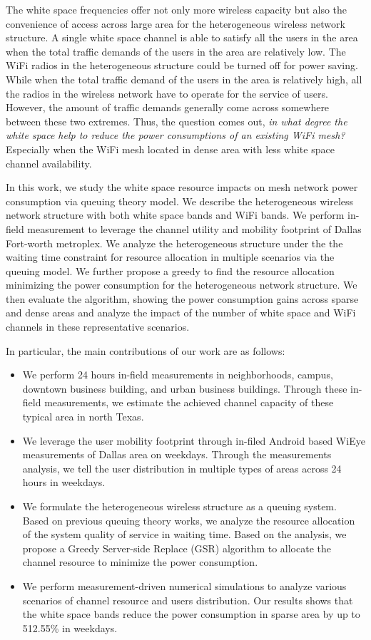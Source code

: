 The white space frequencies offer not only more wireless capacity but also the convenience of access 
across large area for the heterogeneous wireless network structure. 
A single white space channel is able to satisfy all the users in the area when the total traffic demands of 
the users in the area are relatively low. The WiFi radios in the heterogeneous structure could be turned off 
for power saving. 
While when the total traffic demand of the users in the area is relatively high, all the radios in the wireless network 
have to operate for the service of users.
However, the amount of traffic demands generally come across somewhere between these two extremes. Thus, the 
question comes out, {\it in what degree the white space help to reduce the power consumptions of an existing 
WiFi mesh?} Especially when the WiFi mesh located in dense area with less white space channel availability.

In this work, we study the white space resource impacts on mesh network power consumption via queuing theory model.
We describe the heterogeneous wireless network structure with both white space bands and WiFi bands. 
We perform in-field measurement to leverage the channel utility and mobility footprint of Dallas Fort-worth metroplex.
We analyze the heterogeneous structure under the the waiting 
time constraint for resource allocation in multiple scenarios via the queuing model. We further propose a greedy 
to find the resource allocation minimizing the power consumption for the heterogeneous network structure. 
We then evaluate the algorithm, showing the power consumption gains across sparse and dense areas and 
analyze the impact of the number of white space and WiFi channels in these representative scenarios.

In particular, the main contributions of our work are as follows:
\begin{itemize}
\item We perform 24 hours in-field measurements in neighborhoods, campus, downtown business building, 
and urban business buildings. Through these in-field measurements, we estimate the achieved channel capacity of 
these typical area in north Texas.
\item We leverage the user mobility footprint through in-filed Android based WiEye measurements of Dallas area on weekdays. 
Through the measurements analysis, we tell the user distribution in multiple types of areas across 24 hours in weekdays. 
\item 
We formulate the heterogeneous wireless structure as a queuing system. Based on previous queuing theory works, we 
analyze the resource allocation of the system quality of service in waiting time. Based on the analysis, we propose a 
Greedy Server-side Replace (GSR) algorithm to allocate the channel resource to minimize the power consumption.
\item We perform measurement-driven numerical simulations to analyze various scenarios of channel resource and 
users distribution. Our results shows that the white space bands reduce the power consumption in
sparse area by up to 512.55\% in weekdays.
\end{itemize}

